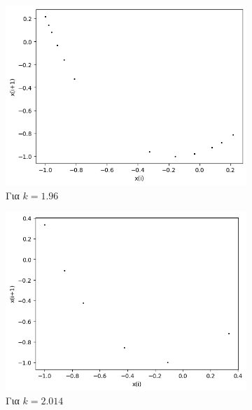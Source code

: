\begin{figure}[ht]
	\centering
	\begin{subfigure}[b]{0.4\textwidth}
		\centering
		\includegraphics[width=\textwidth]{LateX images/cheb q=0.9/g4}
		\caption{Για $k=1.96$}
		\label{f:k142}
	\end{subfigure}
	\hfill
	\begin{subfigure}[b]{0.4\textwidth}
		\centering
		\includegraphics[width=\textwidth]{LateX images/cheb q=0.9/g5}
		\caption{Για $k=2.014$}
		\label{f:k143}
	\end{subfigure}
	\hfill
	\begin{subfigure}[b]{0.4\textwidth}
		\centering

\end{subfigure}
\end{figure}
